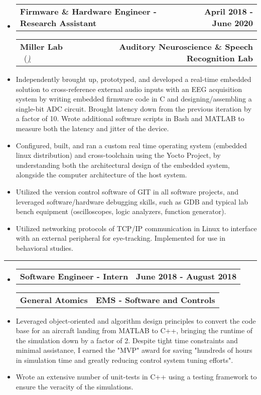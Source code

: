 \documentclass[10pt,letterpaper]{article}
\makeatletter
\newcommand{\header}[2]
{
	\begin{tabular*}{\linewidth}{l @{\extracolsep{\fill}} r}
		\hspace{-27pt} #1 & #2 \\
	\end{tabular*}
}
\makeatother
\begin{document}
\begin{itemize}
	\item[]
		\header
			{\textbf{Firmware \& Hardware Engineer - Research Assistant}} 
			{\textbf{April 2018 - June 2020}}
		\header
		{\textbf{Miller Lab} \ (\href{https://millerlab.faculty.ucdavis.edu}{\small \emph{\underline{\smash{millerlab.faculty.ucdavis.edu})}}} }
			{\textbf{Auditory Neuroscience \& Speech Recognition Lab}} 
		\item
			Independently brought up, prototyped, and developed a real-time embedded solution to cross-reference external audio inputs with an EEG acquisition system by writing embedded 
			firmware code in C and designing/assembling a single-bit ADC circuit. Brought latency down from the previous iteration by a factor of 10. 
			Wrote additional software scripts in Bash and MATLAB to measure both the latency and jitter of the device.
		\item 
			Configured, built, and ran a custom real time operating system (embedded linux distribution) and cross-toolchain using the Yocto Project, by understanding both the architectural design of the embedded system, alongside the computer architecture of the host system.
		\item
			Utilized the version control software of GIT in all software projects, and leveraged software/hardware debugging skills, such as GDB and typical lab bench equipment (oscilloscopes, logic analyzers, function generator).
		\item 
			Utilized networking protocols of TCP/IP communication in Linux to interface with an external peripheral for eye-tracking. Implemented for use in behavioral studies.
\end{itemize}

\hrule

\begin{itemize}
	\item[]
		\header
			{\textbf{Software Engineer - Intern}} 
			{\textbf{June 2018 - August 2018}}
		\header
			{\textbf{General Atomics}}
			{\textbf{EMS - Software and Controls}} 
		\item
			Leveraged object-oriented and algorithm design principles to convert the code base for an aircraft landing from MATLAB to C++,
		      	bringing the runtime of the simulation down by a factor of 2. Despite tight time constraints and minimal assistance, I earned the "MVP" award for saving "hundreds of hours in simulation time and greatly reducing control system tuning efforts".

		\item
			Wrote an extensive number of unit-tests in C++ using a testing framework to ensure the veracity of the simulations.
\end{itemize}
\end{document}
